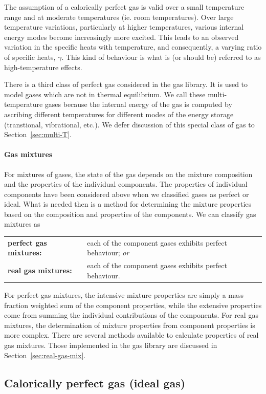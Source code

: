 The assumption of a calorically perfect gas is valid over a small temperature range and at moderate
temperatures (ie. room temperatures).
Over large temperature variations, particularly at higher temperatures, various internal energy modes
become increasingly more excited.
This leads to an observed variation in the specific heats with temperature, and consequently, 
a varying ratio of specific heats, $\gamma$.
This kind of behaviour is what is (or should be) referred to as high-temperature effects.

There is a third class of perfect gas considered in the gas library.
It is used to model gases which are not in thermal equilibrium.
We call these multi-temperature gases because the internal energy of the gas
is computed by ascribing different temperatures for different modes of the energy storage
(transtional, vibrational, etc.).
We defer discussion of this special class of gas to Section~\ref{sec:multi-T}.

\paragraph{Gas mixtures}
For mixtures of gases, the state of the gas depends on the mixture
composition and the properties of the individual components.
The properties of individual components have been considered
above when we classified gases as perfect or ideal.
What is needed then is a method for determining the mixture
properties based on the composition and properties of the components.
We can classify gas mixtures as\\
\begin{tabular}{lp{12cm}}
\textbf{perfect gas mixtures:} & each of the component gases exhibits perfect behaviour; \emph{or} \\
\textbf{real gas mixtures:} & each of the component gases exhibits perfect behaviour.
\end{tabular}

For perfect gas mixtures, the intensive mixture properties are simply a mass fraction weighted sum
of the component properties, while the extensive properties come from summing the individual contributions
of the components.
For real gas mixtures, the determination of mixture properties from component properties is more complex.
There are several methods available to calculate properties of real gas mixtures.
Those implemented in the gas library are discussed in Section~\ref{sec:real-gas-mix}.


\subsection{Calorically perfect gas (ideal gas)}
\label{sec:cal-perf}

